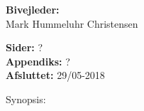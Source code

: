 \begin{minipage}[t]{0.48\textwidth}
\textbf{Bivejleder:} %
\\\hspace*{2ex}
Mark Hummeluhr Christensen \\\hspace*{2ex}



\vspace*{1cm}

\textbf{Sider:} ? \\
\textbf{Appendiks:} ? \\ 
\textbf{Afsluttet:} 29/05-2018

\end{minipage}
\hfill
\begin{minipage}[t]{0.483\textwidth}
Synopsis:  \\[2pt]
\fbox{\parbox{7cm}{}}
\end{minipage}


